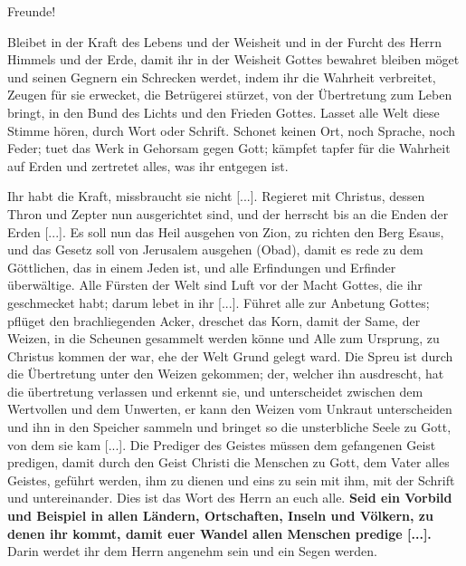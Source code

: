 {
    Freunde!

    \bigskip

    Bleibet in der Kraft des Lebens und der Weisheit und in
    der Furcht des Herrn Himmels und der Erde, damit ihr in der
    Weisheit Gottes bewahret bleiben möget und seinen Gegnern ein
    Schrecken werdet, indem ihr die Wahrheit verbreitet, Zeugen für
    sie erwecket, die Betrügerei stürzet, von der Übertretung zum
    Leben bringt, in den Bund des Lichts und den Frieden Gottes.
    Lasset alle Welt diese Stimme hören, durch Wort oder Schrift.
    Schonet keinen Ort, noch Sprache, noch Feder; tuet das Werk
    in Gehorsam gegen Gott; kämpfet tapfer für die Wahrheit auf
    Erden und zertretet alles, was ihr entgegen ist. 

    Ihr habt die
    Kraft, missbraucht sie nicht [...]. Regieret mit Christus, dessen
    Thron und Zepter nun ausgerichtet sind, und der herrscht bis an
    die Enden der Erden [...]. Es soll nun das Heil ausgehen
    von Zion, zu richten den Berg Esaus, und das Gesetz soll von 
    Jerusalem ausgehen (Obad), damit es rede zu dem Göttlichen, 
    das in einem
    Jeden ist, und alle Erfindungen und Erfinder überwältige. Alle
    Fürsten der Welt sind Luft vor der Macht Gottes, die ihr 
    geschmecket habt; darum lebet in ihr [...].
    Führet alle zur Anbetung Gottes; pflüget den brachliegenden
    Acker, dreschet das Korn, damit der Same, der Weizen, in die
    Scheunen gesammelt werden könne und Alle zum Ursprung,
    zu Christus kommen der war, ehe der Welt Grund gelegt ward.
    Die Spreu ist durch die Übertretung unter den Weizen gekommen;
    der, welcher ihn ausdrescht, hat die übertretung verlassen und
    erkennt sie, und unterscheidet zwischen dem Wertvollen und dem
    Unwerten, er kann den Weizen vom Unkraut unterscheiden und
    ihn in den Speicher sammeln und bringet so die unsterbliche
    Seele zu Gott, von dem sie kam [...]. Die Prediger des Geistes
    müssen dem gefangenen Geist predigen, damit durch den Geist
    Christi die Menschen zu Gott, dem Vater alles Geistes, geführt
    werden, ihm zu dienen und eins zu sein mit ihm, mit der Schrift
    und untereinander. Dies ist das Wort des Herrn an euch alle.
    \textbf{Seid ein Vorbild und Beispiel in allen Ländern, Ortschaften, 
    Inseln und Völkern, zu denen ihr kommt, damit euer
    Wandel allen Menschen predige [...].} Darin werdet ihr dem
    Herrn angenehm sein und ein Segen werden.


}
